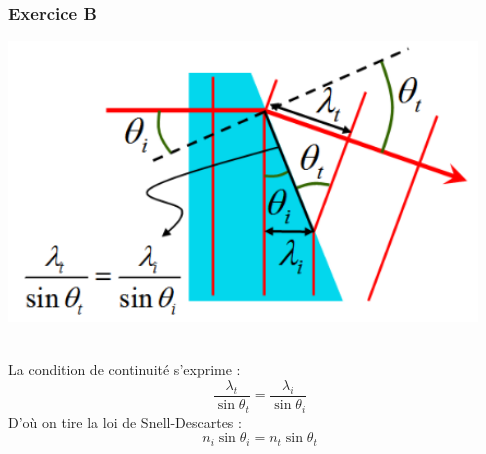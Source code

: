 \documentclass	[11pt, a4paper, openany]{book}
\begin{document}
\subsubsection*{Exercice B}
\begin{center}
\includegraphics[scale=0.50]{prepa/DESC.png}
\end{center}
\ \\ La condition de continuité s'exprime :
$$\frac{\lambda_t}{\sin \theta_t} = \frac{\lambda_i}{\sin \theta_i}$$
D'où on tire la loi de Snell-Descartes :
$$n_i \sin \theta_i = n_t \sin \theta_t$$
\end{document}
